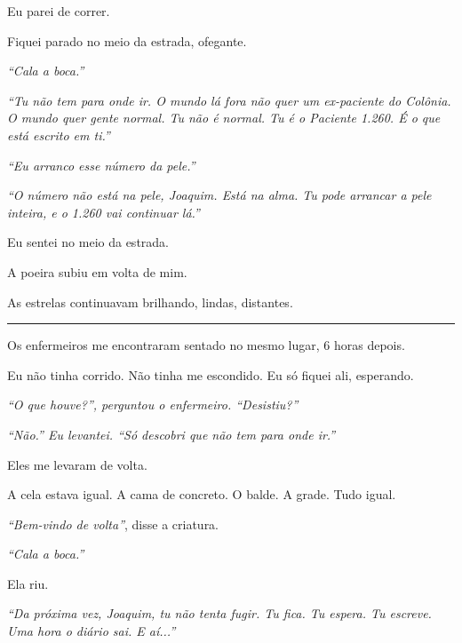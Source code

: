 \noindent Eu parei de correr.

\noindent Fiquei parado no meio da estrada, ofegante.

\noindent \textit{\textquotedblleft{}Cala a boca.\textquotedblright{}}

\noindent \textit{\textquotedblleft{}Tu não tem para onde ir. O mundo lá fora não quer um ex-paciente do Colônia. O mundo quer gente normal. Tu não é normal. Tu é o Paciente 1.260. É o que está escrito em ti.\textquotedblright{}}

\noindent \textit{\textquotedblleft{}Eu arranco esse número da pele.\textquotedblright{}}

\noindent \textit{\textquotedblleft{}O número não está na pele, Joaquim. Está na alma. Tu pode arrancar a pele inteira, e o 1.260 vai continuar lá.\textquotedblright{}}

\noindent Eu sentei no meio da estrada.

\noindent A poeira subiu em volta de mim.

\noindent As estrelas continuavam brilhando, lindas, distantes.

\vspace{0.5em}\noindent\rule{\textwidth}{0.5pt}\vspace{0.5em}

\noindent Os enfermeiros me encontraram sentado no mesmo lugar, 6 horas depois.

\noindent Eu não tinha corrido.
Não tinha me escondido.
Eu só fiquei ali, esperando.

\noindent \textit{\textquotedblleft{}O que houve?\textquotedblright{}\textit{, perguntou o enfermeiro. }\textquotedblleft{}Desistiu?\textquotedblright{}}

\noindent \textit{\textquotedblleft{}Não.\textquotedblright{}\textit{ Eu levantei. }\textquotedblleft{}Só descobri que não tem para onde ir.\textquotedblright{}}

\noindent Eles me levaram de volta.

\noindent A cela estava igual. A cama de concreto. O balde. A grade. Tudo igual.

\noindent \textit{\textquotedblleft{}Bem-vindo de volta\textquotedblright{}}, disse a criatura.

\noindent \textit{\textquotedblleft{}Cala a boca.\textquotedblright{}}

\noindent Ela riu.

\noindent \textit{\textquotedblleft{}Da próxima vez, Joaquim, tu não tenta fugir. Tu fica. Tu espera. Tu escreve. Uma hora o diário sai. E aí...\textquotedblright{}}

